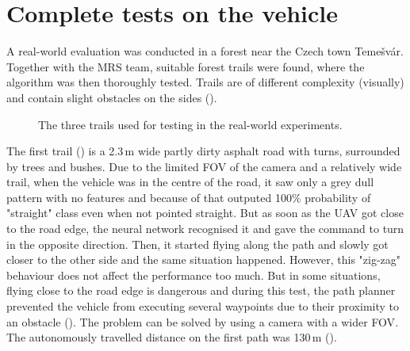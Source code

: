 \section{Complete tests on the vehicle}
\label{rwexperiment}

A real-world evaluation was conducted in a forest near the Czech town Temešvár. Together with the \acs{MRS} team, suitable forest trails were found, where the algorithm was then thoroughly tested. Trails are of different complexity (visually) and contain slight obstacles on the sides (). 

\begin{figure}[!h]

  \centering

  \centering	
  


  \centering
  \caption{The three trails used for testing in the real-world experiments.}
  \label{fig:trails}
\end{figure}

The first trail () is a 2.3\,m wide partly dirty asphalt road with turns, surrounded by trees and bushes. Due to the limited \acs{FOV} of the camera and a relatively wide trail, when the vehicle was in the centre of the road, it saw only a grey dull pattern with no features and because of that outputed 100\% probability of "straight" class even when not pointed straight. But as soon as the \acs{UAV} got close to the road edge, the neural network recognised it and gave the command to turn in the opposite direction. Then, it started flying along the path and slowly got closer to the other side and the same situation happened. However, this "zig-zag" behaviour does not affect the performance too much. But in some situations, flying close to the road edge is dangerous and during this test, the path planner prevented the vehicle from executing several waypoints due to their proximity to an obstacle (). The problem can be solved by using a camera with a wider \acs{FOV}. The autonomously travelled distance on the first path was 130\,m ().

